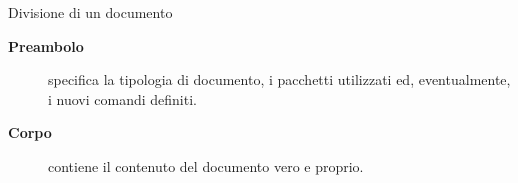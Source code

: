 \begin{frame}{Divisione di un documento}

\begin{description}
	\item [\textbf{Preambolo}] specifica la tipologia di documento, i pacchetti utilizzati ed,
	eventualmente, i nuovi comandi definiti.
	\item [\textbf{Corpo}] contiene il contenuto del documento vero e proprio.
\end{description}

\end{frame}